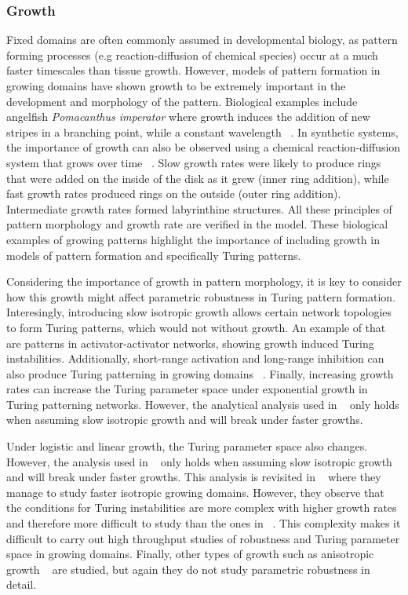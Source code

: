  \subsubsection{Growth}
Fixed domains are often commonly assumed in developmental biology, as pattern forming processes (e.g reaction-diffusion of chemical species) occur at a much faster timescales than tissue growth. %
However, models of pattern formation in growing domains have shown growth to be extremely important in the development and morphology of the pattern.
Biological examples include angelﬁsh \textit{Pomacanthus imperator} where growth induces the addition of new stripes in a branching point, while a constant wavelength ~\parencite{Kondo1995}.
In synthetic systems, the importance of growth can also be observed using a chemical reaction-diffusion system that grows over time ~\parencite{Konow2019}.
Slow growth rates were likely to produce rings that were added on the inside of the disk as it grew (inner ring addition), while fast growth rates produced rings on the outside (outer ring addition).
Intermediate growth rates formed labyrinthine structures.
All these principles of pattern morphology and growth rate are verified in the model.
These biological examples of growing patterns highlight the importance of including growth in models of pattern formation and specifically Turing patterns.

Considering the importance of growth in pattern morphology, it is key to consider how this growth might affect parametric robustness in Turing pattern formation.
Interesingly, introducing slow isotropic growth allows certain network topologies to form Turing patterns, which would not without growth.
An example of that are patterns in activator-activator networks, showing growth induced Turing instabilities.
Additionally, short-range activation and long-range inhibition can also produce Turing patterning in growing domains ~\cite{gaffney2010}.
Finally, increasing growth rates can increase the Turing parameter space under exponential growth in Turing patterning networks.
However, the analytical analysis used in ~\cite{gaffney2010} only holds when assuming slow isotropic growth and will break under faster growths.

Under logistic and linear growth, the Turing parameter space also changes.
However, the analysis used in ~\cite{gaffney2010} only holds when assuming slow isotropic growth and will break under faster growths.
This analysis is revisited in ~\cite{Klika2017} where they manage to study faster isotropic growing domains.
However, they observe that the conditions for Turing instabilities are more complex with higher growth rates and therefore more difficult to study than the ones in ~\cite{gaffney2010}.
This complexity makes it difficult to carry out high throughput studies of robustness and Turing parameter space in growing domains.
Finally, other types of growth such as anisotropic growth ~\parencite{Krause2019} are studied, but again they do not study parametric robustness in detail.

